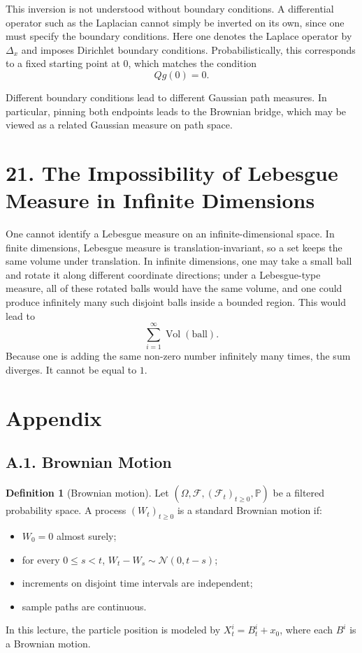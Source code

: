 \documentclass[11pt]{article}
\theoremstyle{definition}
\newtheorem{definition}{Definition}
\theoremstyle{remark}
\begin{document}
This inversion is not understood without boundary conditions. A differential operator such as the Laplacian cannot simply be inverted on its own, since one must specify the boundary conditions. Here one denotes the Laplace operator by $\Delta_x$ and imposes Dirichlet boundary conditions. Probabilistically, this corresponds to a fixed starting point at $0$, which matches the condition
\[
Qg(0)=0.
\]

Different boundary conditions lead to different Gaussian path measures. In particular, pinning both endpoints leads to the Brownian bridge, which may be viewed as a related Gaussian measure on path space.

\section*{21. The Impossibility of Lebesgue Measure in Infinite Dimensions}
One cannot identify a Lebesgue measure on an infinite-dimensional space. In finite dimensions, Lebesgue measure is translation-invariant, so a set keeps the same volume under translation. In infinite dimensions, one may take a small ball and rotate it along different coordinate directions; under a Lebesgue-type measure, all of these rotated balls would have the same volume, and one could produce infinitely many such disjoint balls inside a bounded region. This would lead to
\[
\sum_{i=1}^{\infty} \operatorname{Vol}(\text{ball}).
\]
Because one is adding the same non-zero number infinitely many times, the sum diverges. It cannot be equal to $1$.

\section*{Appendix}
\subsection*{A.1. Brownian Motion}
\begin{definition}[Brownian motion]
Let $(\Omega,\mathcal F,(\mathcal F_t)_{t\ge0},\mathbb P)$ be a filtered probability space. A process $(W_t)_{t\ge0}$ is a standard Brownian motion if:
\begin{itemize}
\item $W_0=0$ almost surely;
\item for every $0\le s<t$, $W_t-W_s\sim\mathcal N(0,t-s)$;
\item increments on disjoint time intervals are independent;
\item sample paths are continuous.
\end{itemize}
In this lecture, the particle position is modeled by $X_t^i=B_t^i+x_0$, where each $B^i$ is a Brownian motion.
\end{definition}
\end{document}
